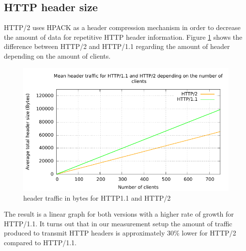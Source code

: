 \subsection{HTTP header size}
\label{subsec:header_size}

HTTP/2 uses HPACK \cite{hpack} as a header compression mechanism in order to decrease the amount of data for repetitive HTTP header information. Figure \ref{fig:headersize} shows the difference between HTTP/2 and HTTP/1.1 regarding the amount of header depending on the amount of clients.

\begin{figure}[H]
	\centering
	\includegraphics[scale=1,trim=0.0cm .0cm .0cm .0cm,clip]{images/headertraffic.pdf}
	\caption{header traffic in bytes for HTTP1.1 and HTTP/2}
	\label{fig:headersize}
\end{figure}

The result is a linear graph for both versions with a higher rate of growth for HTTP/1.1. It turns out that in our measurement setup the amount of traffic produced to transmit HTTP headers is approximately 30\% lower for HTTP/2 compared to HTTP/1.1. 
